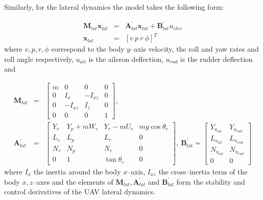 Similarly, for the lateral dynamics the model takes the following form:


\small
\begin{eqnarray}\label{LAT_DYN}
 \mathbf{M}_{lat}\dot{\mathbf{x}}_{lat} &=& \mathbf{A}^\prime_{lat}\mathbf{x}_{lat}+\mathbf{B}^\prime_{lat}u_{elev} \\ \nonumber
 \mathbf{x}_{lat} &=& \left[v~p~r~\phi \right]^T
\end{eqnarray}
\normalsize
where $v,p,r,\phi$ correspond to the body $y$--axis velocity, the roll and yaw rates and roll angle respectively, $u_{ail}$ is the aileron deflection, $u_{rud}$ is the rudder deflection and

\scriptsize
\begin{eqnarray}
\mathbf{M}_{lat} &=& \begin{bmatrix}
m & 0 & 0 & 0\\ 
0 & I_x & -I_{xz} & 0\\ 
0 & -I_{xz} & I_z & 0\\ 
0 & 0 & 0 & 1
\end{bmatrix},\\ \nonumber 
\mathbf{A}^\prime_{lat} &=& \begin{bmatrix}
Y_v & Y_p + mW_e & Y_r-mU_e & mg\cos\theta_e\\ 
L_v & L_p & L_r & 0\\ 
N_v & N_p & N_r & 0 \\ 
0 & 1 & \tan\theta_e & 0
\end{bmatrix},~ \mathbf{B}^\prime_{lat} = \begin{bmatrix}
Y_{u_{ail}} & Y_{u_{rud}}\\ 
L_{u_{ail}} & L_{u_{rud}}\\ 
N_{u_{ail}} & N_{u_{rud}}\\ 
0 & 0
\end{bmatrix}
\end{eqnarray}
\normalsize
where $I_x$ the inertia around the body $x$--axis, $I_{xz}$ the cross--inertia term of the body $x,z$--axes and the elements of $\mathbf{M}_{lat},\mathbf{A}^\prime_{lat}$ and $\mathbf{B}^\prime_{lat}$ form the stability and control derivatives of the UAV lateral dynamics. 